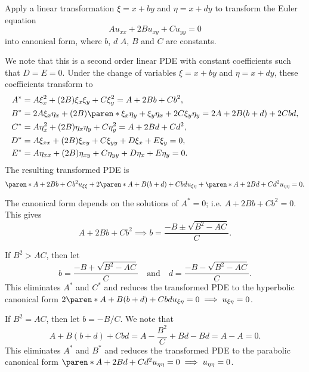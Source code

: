 \documentclass[11pt]{penrose}
\begin{document}
\begin{problem}{2}
    Apply a linear transformation $\xi = x+by$ and $\eta = x+dy$ to transform the Euler equation
    \begin{equation*}
        A u_{xx} + 2B u_{xy} + C u_{yy} = 0
    \end{equation*}
    into canonical form, where $b$, $d$ $A$, $B$ and $C$ are constants.

    \solution We note that this is a second order linear PDE with constant coefficients such that $D=E=0$. Under the change of variables $\xi = x+by$ and $\eta = x+dy$, these coefficients transform to
    \begin{align*}
        A^{*} &= A \xi_x^2 + (2B) \xi_x \xi_y + C \xi_y^2 = A + 2Bb + Cb^2,\\
        B^{*} &= 2A\xi_x \eta_x + (2B) \paren*{\xi_x \eta_y + \xi_y \eta_x} + 2C \xi_y \eta_y = 2A + 2B (b+d) + 2C bd,\\
        C^{*} &= A \eta_x^2 + (2B) \eta_x \eta_y + C \eta_y^2 = A + 2Bd + Cd^2,\\
        D^{*} &= A \xi_{xx} + (2B) \xi_{xy} + C \xi_{yy} + D \xi_{x} + E \xi_{y} = 0,\\
        E^{*} &= A \eta_{xx} + (2B) \eta_{xy} + C \eta_{yy} + D \eta_{x} + E \eta_{y} = 0.
    \end{align*}
    The resulting transformed PDE is
    \begin{equation*}
        \paren*{A + 2Bb + Cb^2} u_{\xi\xi} + 2\paren*{A + B (b+d) + C bd} u_{\xi\eta} + \paren*{A + 2Bd + Cd^2} u_{\eta\eta} = 0.
    \end{equation*}

    The canonical form depends on the solutions of $A^* = 0$; i.e. $A + 2Bb + Cb^2 = 0$. This gives
    \begin{equation*}
        A + 2Bb + Cb^2
        \implies
        b = \frac{-B \pm \sqrt{B^2 - AC}}{C}.
    \end{equation*}

    If $B^2 > AC$, then let
    \begin{equation*}
        b = \frac{-B + \sqrt{B^2 - AC}}{C}
        \quad\text{and}\quad
        d = \frac{-B - \sqrt{B^2 - AC}}{C}.
    \end{equation*}
    This eliminates $A^*$ and $C^*$ and reduces the transformed PDE to the hyperbolic canonical form $2\paren*{A + B (b+d) + C bd} u_{\xi\eta} = 0 \implies u_{\xi\eta} = 0$.

    If $B^2 = AC$, then let $b = -B/C$. We note that
    \begin{equation*}
        A + B (b+d) + C bd = A - \frac{B^2}{C} + Bd - Bd = A - A = 0.
    \end{equation*}
    This eliminates $A^*$ and $B^*$ and reduces the transformed PDE to the parabolic canonical form $\paren*{A + 2Bd + Cd^2} u_{\eta\eta} = 0 \implies u_{\eta\eta} = 0$.


\end{problem}
\end{document}
